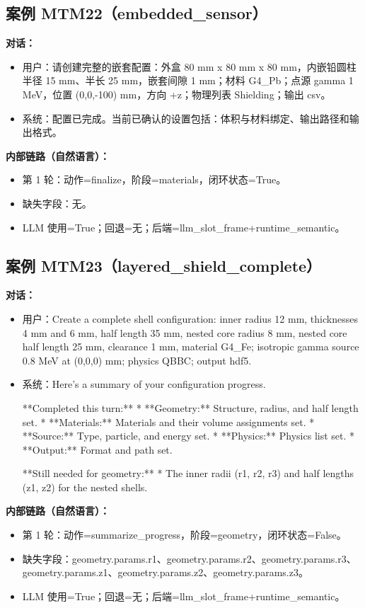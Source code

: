 \documentclass[11pt]{ctexart}
\begin{document}
\subsection{案例 MTM22（embedded\_sensor）}
\textbf{对话：}
\begin{itemize}
\item 用户：请创建完整的嵌套配置：外盒 80 mm x 80 mm x 80 mm，内嵌铅圆柱半径 15 mm、半长 25 mm，嵌套间隙 1 mm；材料 G4\_Pb；点源 gamma 1 MeV，位置 (0,0,-100) mm，方向 +z；物理列表 Shielding；输出 csv。
\item 系统：配置已完成。当前已确认的设置包括：体积与材料绑定、输出路径和输出格式。
\end{itemize}
\textbf{内部链路（自然语言）：}
\begin{itemize}
\item 第 1 轮：动作=finalize，阶段=materials，闭环状态=True。
\item 缺失字段：无。
\item LLM 使用=True；回退=无；后端=llm\_slot\_frame+runtime\_semantic。
\end{itemize}
\subsection{案例 MTM23（layered\_shield\_complete）}
\textbf{对话：}
\begin{itemize}
\item 用户：Create a complete shell configuration: inner radius 12 mm, thicknesses 4 mm and 6 mm, half length 35 mm, nested core radius 8 mm, nested core half length 25 mm, clearance 1 mm, material G4\_Fe; isotropic gamma source 0.8 MeV at (0,0,0) mm; physics QBBC; output hdf5.
\item 系统：Here's a summary of your configuration progress.

**Completed this turn:**
*   **Geometry:** Structure, radius, and half length set.
*   **Materials:** Materials and their volume assignments set.
*   **Source:** Type, particle, and energy set.
*   **Physics:** Physics list set.
*   **Output:** Format and path set.

**Still needed for geometry:**
*   The inner radii (r1, r2, r3) and half lengths (z1, z2) for the nested shells.
\end{itemize}
\textbf{内部链路（自然语言）：}
\begin{itemize}
\item 第 1 轮：动作=summarize\_progress，阶段=geometry，闭环状态=False。
\item 缺失字段：geometry.params.r1、geometry.params.r2、geometry.params.r3、geometry.params.z1、geometry.params.z2、geometry.params.z3。
\item LLM 使用=True；回退=无；后端=llm\_slot\_frame+runtime\_semantic。
\end{itemize}
\end{document}
